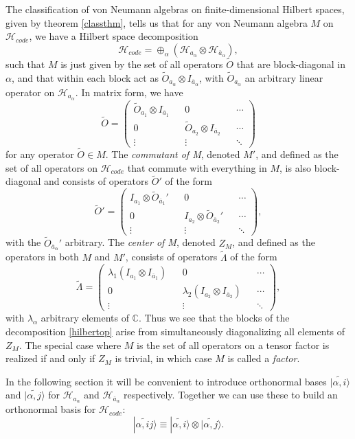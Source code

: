\documentclass[12pt]{article}
\newcommand{\be}{\begin{equation}}
\newcommand{\ee}{\end{equation}}
\newcommand{\ran}{\rangle}
\newcommand{\wt}{\widetilde}
\newcommand{\Hh}{\mathcal{H}}
\newcommand{\ab}{\ol{a}}
\newcommand{\Hc}{\mathcal{H}_{code}}
\newcommand{\ol}{\overline}
\begin{document}
The classification of von Neumann algebras on finite-dimensional Hilbert spaces, given by theorem \eqref{classthm}, tells us that for any von Neumann algebra $M$ on $\Hc$, we have a Hilbert space decomposition
\be\label{hilbertop}
\Hc=\oplus_\alpha \left(\Hh_{a_\alpha}\otimes \Hh_{\ab_\alpha}\right),
\ee
such that $M$ is just given by the set of all operators $\wt{O}$ that are block-diagonal in $\alpha$, and that within each block act as $\wt{O}_{a_\alpha}\otimes I_{\ab_\alpha}$, with $\wt{O}_{a_\alpha}$ an arbitrary linear operator on $\Hh_{a_\alpha}$.  In matrix form, we have
\be\label{Oform}
\wt{O}=
\begin{pmatrix}
\wt{O}_{a_1}\otimes I_{\ab_1} && 0 && \cdots\\
0 && \wt{O}_{a_2}\otimes I_{\ab_2} &&\cdots \\
\vdots && \vdots && \ddots
\end{pmatrix}
\ee
for any operator $\wt{O}\in M$.  The \textit{commutant of M}, denoted $M'$, and defined as the set of all operators on $\Hc$ that commute with everything in $M$, is also block-diagonal and consists of operators $\wt{O}'$ of the form
\be
\wt{O}'=
\begin{pmatrix}
I_{a_1}\otimes \wt{O}_{\ab_1}' && 0 && \cdots\\
0 && I_{a_2}\otimes \wt{O}_{\ab_2}' &&\cdots \\
\vdots && \vdots && \ddots
\end{pmatrix},
\ee
with the $\wt{O}_{\ab_\alpha}'$ arbitrary.  The \textit{center of M}, denoted $Z_M$, and defined as the operators in both $M$ and $M'$, consists of operators $\wt{\Lambda}$ of the form
\be\label{ocenter}
\wt{\Lambda}=
\begin{pmatrix}
\lambda_1\left(I_{a_1}\otimes I_{\ab_1}\right) && 0 && \cdots\\
0 && \lambda_2 \left(I_{a_2}\otimes I_{\ab_2}\right) &&\cdots \\
\vdots && \vdots && \ddots
\end{pmatrix},
\ee
with $\lambda_\alpha$ arbitrary elements of $\mathbb{C}$.  Thus we see that the blocks of the decomposition \eqref{hilbertop} arise from simultaneously diagonalizing all elements of $Z_M$. The special case where $M$ is the set of all operators on a tensor factor is realized if and only if $Z_M$ is trivial, in which case $M$ is called a \textit{factor}. 

In the following section it will be convenient to introduce orthonormal bases $|\wt{\alpha, i}\ran$ and $|\wt{\alpha, j}\ran$ for $\Hh_{a_\alpha}$ and $\Hh_{\ab_\alpha}$ respectively.  Together we can use these to build an orthonormal basis for $\Hc$:
\be\label{opbasis}
|\wt{\alpha, i j}\ran\equiv |\wt{\alpha, i}\ran\otimes|\wt{\alpha, j}\ran.
\ee  
\end{document}

